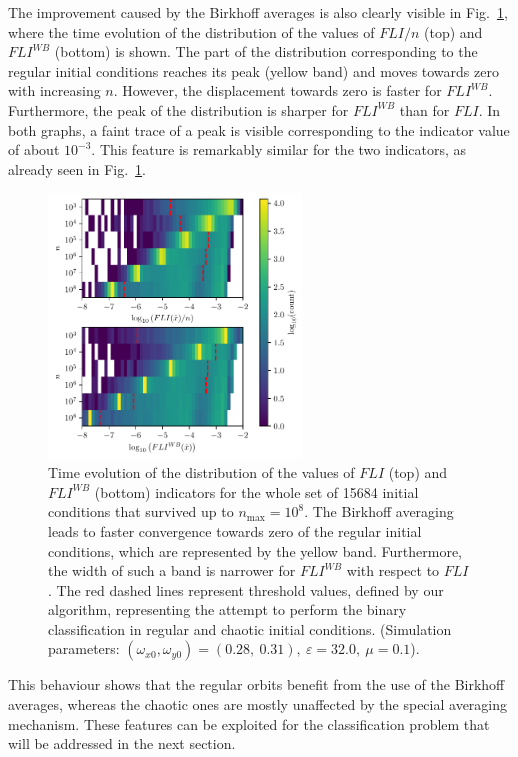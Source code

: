 The improvement caused by the Birkhoff averages is also clearly visible in Fig.~\ref{fig:fli_colormap_mean_birk}, where the time evolution of the distribution of the values of $FLI/n$ (top) and $FLI^{WB}$ (bottom) is shown. The part of the distribution corresponding to the regular initial conditions reaches its peak (yellow band) and moves towards zero with increasing $n$. However, the displacement towards zero is faster for $FLI^{WB}$. Furthermore, the peak of the distribution is sharper for $FLI^{WB}$ than for $FLI$. In both graphs, a faint trace of a peak is visible corresponding to the indicator value of about $10^{-3}$. This feature is remarkably similar for the two indicators, as already seen in Fig.~\ref{fig:fli_colormap_mean_birk}.

\begin{figure}[htp]
    \centering
    \includegraphics[width=0.6\textwidth]{6_dynamic_indicators/fig/lyapunov_birkhoff_map.pdf}
    \caption{Time evolution of the distribution of the values of $FLI$ (top) and $FLI^{WB}$ (bottom) indicators for the whole set of 15684 initial conditions that survived up to $n_\text{max}=10^8$. The Birkhoff averaging leads to faster convergence towards zero of the regular initial conditions, which are represented by the yellow band. Furthermore, the width of such a band is narrower for $FLI^{WB}$ with respect to $FLI$. The red dashed lines represent threshold values, defined by our algorithm, representing the attempt to perform the binary classification in regular and chaotic initial conditions. (Simulation parameters: $(\omega_{x0},\omega_{y0})= (0.28,\ 0.31),\ \varepsilon=32.0,\  \mu=0.1$).}
    \label{fig:fli_colormap_mean_birk}
\end{figure}

This behaviour shows that the regular orbits benefit from the use of the Birkhoff averages, whereas the chaotic ones are mostly unaffected by the special averaging mechanism. These features can be exploited for the classification problem that will be addressed in the next section.

